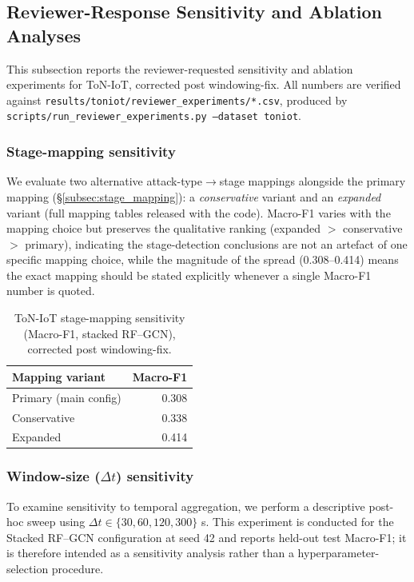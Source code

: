 \documentclass[pdflatex,sn-mathphys-num]{sn-jnl}
\theoremstyle{thmstyleone}%
\theoremstyle{thmstyletwo}%
\theoremstyle{thmstylethree}%
\begin{document}
\subsection{Reviewer-Response Sensitivity and Ablation Analyses}
\label{sec:reviewer_response_toniot}
This subsection reports the reviewer-requested sensitivity and ablation experiments for ToN-IoT, corrected post windowing-fix. All numbers are verified against \texttt{results/toniot/reviewer\_experiments/*.csv}, produced by \texttt{scripts/run\_reviewer\_experiments.py --dataset toniot}.

\subsubsection{Stage-mapping sensitivity}
\label{subsec:stage_mapping_sensitivity_corrected}
We evaluate two alternative attack-type$\rightarrow$stage mappings alongside the primary mapping (\S\ref{subsec:stage_mapping}): a \emph{conservative} variant and an \emph{expanded} variant (full mapping tables released with the code). Macro-F1 varies with the mapping choice but preserves the qualitative ranking (expanded $>$ conservative $>$ primary), indicating the stage-detection conclusions are not an artefact of one specific mapping choice, while the magnitude of the spread (0.308--0.414) means the exact mapping should be stated explicitly whenever a single Macro-F1 number is quoted.

\begin{table}[!t]
\centering
\caption{ToN-IoT stage-mapping sensitivity (Macro-F1, stacked RF--GCN), corrected post windowing-fix.}
\label{tab:toniot_stage_mapping_corrected}
\begin{tabular}{lr}
\toprule
\textbf{Mapping variant} & \textbf{Macro-F1} \\
\midrule
Primary (main config) & 0.308 \\
Conservative & 0.338 \\
Expanded & 0.414 \\
\bottomrule
\end{tabular}
\end{table}

\subsubsection{Window-size ($\Delta t$) sensitivity}
\label{subsec:window_sensitivity_corrected}
To examine sensitivity to temporal aggregation, we perform a descriptive post-hoc sweep using $\Delta t\in\{30,60,120,300\}$ s. This experiment is conducted for the Stacked RF--GCN configuration at seed 42 and reports held-out test Macro-F1; it is therefore intended as a sensitivity analysis rather than a hyperparameter-selection procedure.
\end{document}
